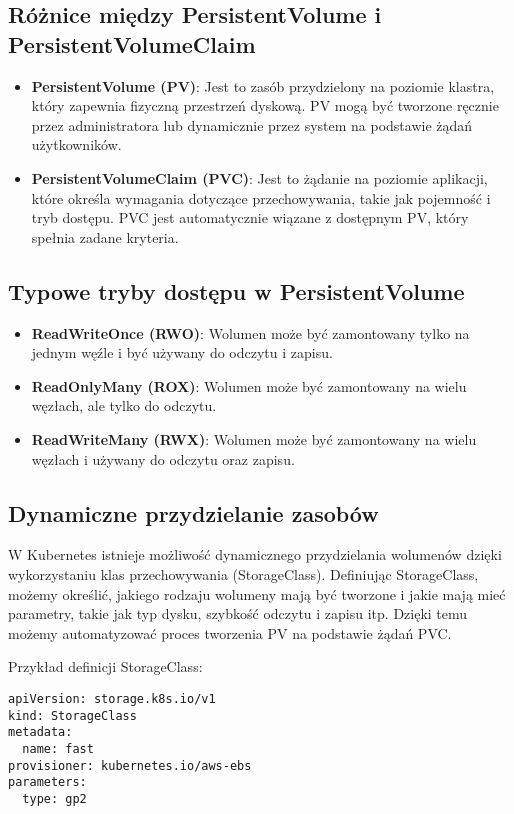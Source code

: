 \documentclass{article}
\begin{document}
\subsection{Różnice między PersistentVolume i PersistentVolumeClaim}

\begin{itemize}
    \item \textbf{PersistentVolume (PV)}: Jest to zasób przydzielony na poziomie klastra, który zapewnia fizyczną przestrzeń dyskową. PV mogą być tworzone ręcznie przez administratora lub dynamicznie przez system na podstawie żądań użytkowników.
    \item \textbf{PersistentVolumeClaim (PVC)}: Jest to żądanie na poziomie aplikacji, które określa wymagania dotyczące przechowywania, takie jak pojemność i tryb dostępu. PVC jest automatycznie wiązane z dostępnym PV, który spełnia zadane kryteria.
\end{itemize}

\subsection{Typowe tryby dostępu w PersistentVolume}

\begin{itemize}
    \item \textbf{ReadWriteOnce (RWO)}: Wolumen może być zamontowany tylko na jednym węźle i być używany do odczytu i zapisu.
    \item \textbf{ReadOnlyMany (ROX)}: Wolumen może być zamontowany na wielu węzłach, ale tylko do odczytu.
    \item \textbf{ReadWriteMany (RWX)}: Wolumen może być zamontowany na wielu węzłach i używany do odczytu oraz zapisu.
\end{itemize}

\subsection{Dynamiczne przydzielanie zasobów}

W Kubernetes istnieje możliwość dynamicznego przydzielania wolumenów dzięki wykorzystaniu klas przechowywania (StorageClass). Definiując StorageClass, możemy określić, jakiego rodzaju wolumeny mają być tworzone i jakie mają mieć parametry, takie jak typ dysku, szybkość odczytu i zapisu itp. Dzięki temu możemy automatyzować proces tworzenia PV na podstawie żądań PVC.

Przykład definicji StorageClass:
\begin{lstlisting}
apiVersion: storage.k8s.io/v1
kind: StorageClass
metadata:
  name: fast
provisioner: kubernetes.io/aws-ebs
parameters:
  type: gp2
\end{lstlisting}
\end{document}
